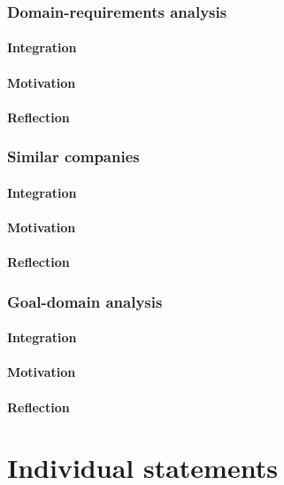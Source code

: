 \documentclass[10pt]{article}
\begin{document}
\subsubsection{Domain-requirements analysis}
\paragraph{Integration}
\paragraph{Motivation}
\paragraph{Reflection}


\subsubsection{Similar companies}
\paragraph{Integration}
\paragraph{Motivation}
\paragraph{Reflection}


\subsubsection{Goal-domain analysis}
\paragraph{Integration}
\paragraph{Motivation}
\paragraph{Reflection}

\section{Individual statements}
\noindent
\end{document}
